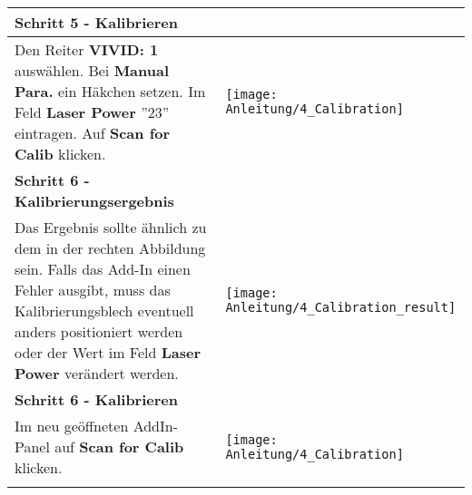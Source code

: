 \begin{longtable}{|>{\RaggedRight}m{5cm}|m{8cm}|}
\pagebreak 



\multicolumn{2}{|l|}%
{{\textbf{Schritt 5 - Kalibrieren}}}
\\ \hline
Den Reiter \textbf{VIVID: 1} auswählen.\linebreak
Bei \textbf{Manual Para.} ein Häkchen setzen.\linebreak
Im Feld \textbf{Laser Power} ''23'' eintragen.\linebreak
Auf \textbf{Scan for Calib} klicken.
& 
\texttt{[image: Anleitung/4\_Calibration]}
\\ \hline  

\multicolumn{2}{|l|}%
{{\textbf{Schritt 6 - Kalibrierungsergebnis}}}
\\ \hline
Das Ergebnis sollte ähnlich zu dem in der rechten Abbildung sein. \linebreak
Falls das Add-In einen Fehler ausgibt, muss das Kalibrierungsblech eventuell anders positioniert werden oder der Wert im Feld \textbf{Laser Power} verändert werden.
& 
\texttt{[image: Anleitung/4\_Calibration\_result]}
\\ \hline  

\pagebreak 



\multicolumn{2}{|l|}%
{{\textbf{Schritt 6 - Kalibrieren}}}
\\ \hline
Im neu geöffneten AddIn-Panel auf \textbf{Scan for Calib} klicken.

& 
\texttt{[image: Anleitung/4\_Calibration]}
\\ \hline  
\pagebreak 





\end{longtable} 

